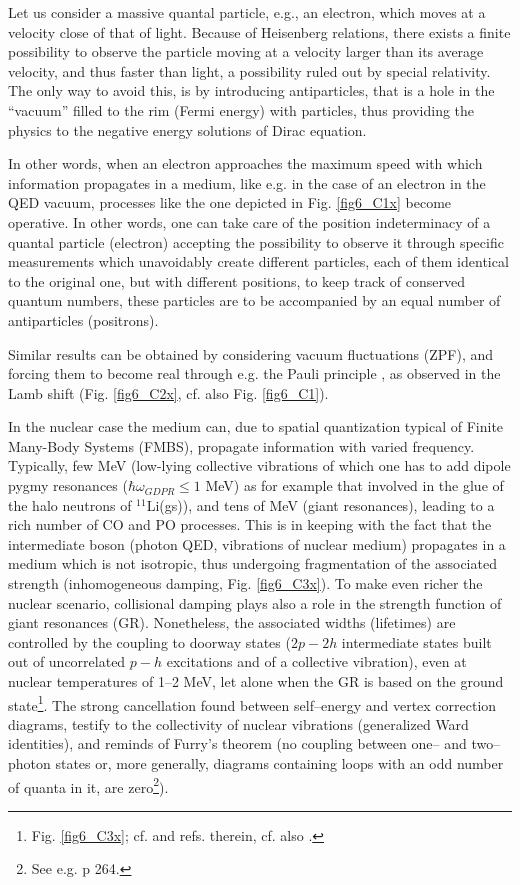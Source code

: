 \begin{subappendices}
Let us consider a massive quantal particle, e.g., an electron, which moves at a velocity close of that of light. Because of Heisenberg relations, there exists a finite possibility to observe the particle moving at a velocity larger than its average velocity, and thus faster than light, a possibility ruled out by special relativity. The only way to avoid this, is by introducing antiparticles, that is a hole in the ``vacuum'' filled to the rim (Fermi energy) with particles, thus providing the physics to the negative energy solutions of Dirac equation.

In other words, when an electron approaches the maximum speed with which information propagates in a medium, like e.g. in the case of an electron in the QED vacuum, processes like the one depicted in Fig. \ref{fig6_C1x} become operative. In other words, one can take care of the position indeterminacy of a quantal particle (electron) accepting the possibility to observe it through specific measurements which unavoidably create different particles, each of them identical to the original one, but with different positions, to keep track of conserved quantum numbers, these particles are to be accompanied by an equal number of antiparticles (positrons).

Similar results can be obtained by considering vacuum fluctuations (ZPF), and forcing them to become real through e.g. the Pauli principle \citep{Pauli:47}, as observed in the Lamb shift (Fig. \ref{fig6_C2x}, cf. also Fig. \ref{fig6_C1}).


In the nuclear case the medium can, due to spatial quantization typical of Finite Many-Body Systems (FMBS), propagate information with varied frequency. Typically, few MeV (low-lying collective vibrations of  which one has to add dipole pygmy resonances ($\hbar\omega_{GDPR}\leq 1$ MeV) as for example that involved in the glue of the halo neutrons of $^{11}$Li(gs)), and tens of MeV (giant resonances), leading to a rich number of CO and PO processes. This is in keeping with the fact that the intermediate boson (photon QED, vibrations of nuclear medium) propagates in a medium which is not isotropic, thus undergoing fragmentation of the associated strength (inhomogeneous damping, Fig. \ref{fig6_C3x}). To make even richer the nuclear scenario, collisional damping plays also a role in the strength function of giant resonances (GR). Nonetheless, the associated widths (lifetimes) are controlled by the coupling to doorway states ($2p-2h$ intermediate states built out of uncorrelated $p-h$ excitations and of a collective vibration), even at nuclear temperatures of 1--2 MeV, let alone when the GR is based on the ground state\footnote{Fig. \ref{fig6_C3x}; cf. \cite{Bortignon:98} and refs. therein, cf. also \cite{Broglia:87}.}. The strong cancellation found between self--energy and vertex correction diagrams, testify to the collectivity of nuclear vibrations (generalized Ward identities), and reminds of Furry's theorem (no coupling between one-- and two--photon states or, more generally, diagrams containing loops with an odd number of quanta in it, are zero\footnote{See e.g. \cite{Mehra:96} p 264.}).



\end{subappendices}
